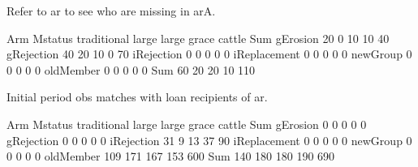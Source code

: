Refer to \textsf{ar} to see who are missing in \textsf{arA}.
\begin{Schunk}
\begin{Soutput}
              Arm
Mstatus        traditional large large grace cattle Sum
  gErosion              20     0          10     10  40
  gRejection            40    20          10      0  70
  iRejection             0     0           0      0   0
  iReplacement           0     0           0      0   0
  newGroup               0     0           0      0   0
  oldMember              0     0           0      0   0
  Sum                   60    20          20     10 110
\end{Soutput}
\end{Schunk}
Initial period obs matches with loan recipients of \textsf{ar}.
\begin{Schunk}
\begin{Soutput}
              Arm
Mstatus        traditional large large grace cattle Sum
  gErosion               0     0           0      0   0
  gRejection             0     0           0      0   0
  iRejection            31     9          13     37  90
  iReplacement           0     0           0      0   0
  newGroup               0     0           0      0   0
  oldMember            109   171         167    153 600
  Sum                  140   180         180    190 690
\end{Soutput}
\end{Schunk}

